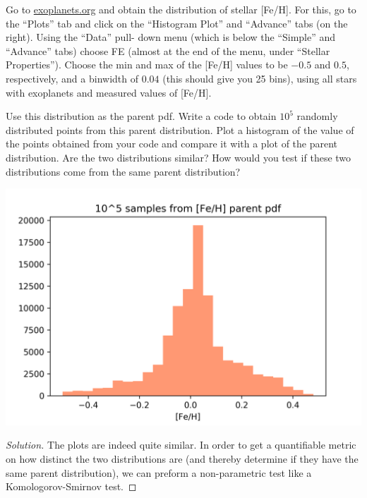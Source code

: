 \documentclass[10pt, physics]{homework}
\begin{document}
	\begin{problem}
		Go to \url{exoplanets.org} and obtain the distribution of stellar [Fe/H]. For this, go to the ``Plots'' tab and click on the “Histogram Plot” and ``Advance'' tabs (on the right). Using the ``Data'' pull- down menu (which is below the ``Simple'' and ``Advance'' tabs) choose FE (almost at the end of the menu, under “Stellar Properties”). Choose the min and max of the [Fe/H] values to be $-0.5$ and $0.5$, respectively, and a binwidth of $0.04$ (this should give you 25 bins), using all stars with exoplanets and measured values of [Fe/H].

		Use this distribution as the parent pdf. Write a code to obtain $10^5$ randomly distributed points from this parent distribution. Plot a histogram of the value of the points obtained from your code and compare it with a plot of the parent distribution. Are the two distributions similar? How would you test if these two distributions come from the same parent distribution?
	\end{problem}
	\includegraphics[width=\textwidth]{2}
	\begin{proof}[Solution]
		The plots are indeed quite similar.
		In order to get a quantifiable metric on how distinct the two distributions are (and thereby determine if they have the same parent distribution), we can preform a non-parametric test like a Komologorov-Smirnov test.
	\end{proof}
\end{document}
